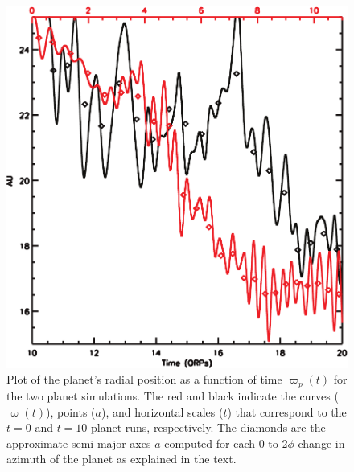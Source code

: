 \documentclass[12pt,manuscript,authoryear]{aastex}
\begin{document}
\begin{figure}[t]
\center
\includegraphics[width=12cm]{../Figures/planeta.pdf}
\caption{Plot of the planet's radial position as a function of time $\varpi_p(t)$ for the two planet simulations. The red and black indicate the curves ($\varpi(t)$), points ($a$), and horizontal scales ($t$) that correspond to the $t = 0$ and $t = 10$ planet runs, respectively. The diamonds are the approximate semi-major axes $a$ computed for each 0 to 2$\phi$ change in azimuth of the planet as explained in the text.}
\label{fig:a}
\end{figure}
\end{document}
